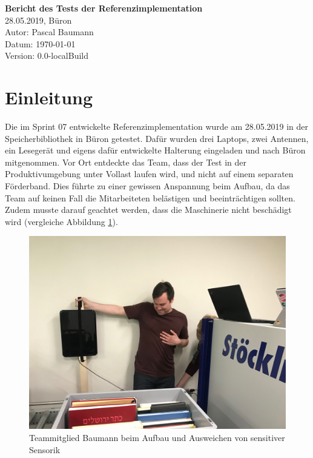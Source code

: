 \documentclass[parskip=full, a4paper]{scrartcl}
\providecommand{\docversion}{0.0-localBuild}
\begin{document}
\begin{titlepage}
\vspace*{2.5cm}
\noindent
\Huge{\textbf{Bericht des Tests der Referenzimplementation}} \\
\noindent
\Large{28.05.2019, Büron}\\
\vfill
\noindent
\large{Autor: Pascal Baumann}\\
\noindent
\large{Datum: \today}\\
\noindent
\large{Version: \docversion}\\
\end{titlepage}

\tableofcontents
\clearpage

\section{Einleitung}
Die im Sprint 07 entwickelte Referenzimplementation wurde am 28.05.2019 in der Speicherbibliothek in Büron getestet. Dafür wurden drei Laptops, zwei Antennen, ein Lesegerät und eigens dafür entwickelte Halterung eingeladen und nach Büron mitgenommen. Vor Ort entdeckte das Team, dass der Test in der Produktivumgebung unter Vollast laufen wird, und nicht auf einem separaten Förderband. Dies führte zu einer gewissen Anspannung beim Aufbau, da das Team auf keinen Fall die Mitarbeiteten belästigen und beeinträchtigen sollten. Zudem musste darauf geachtet werden, dass die Maschinerie nicht beschädigt wird (vergleiche Abbildung \ref{fig:AufbauSensorik}).

\begin{figure}[htb]
	\centering
	\includegraphics[keepaspectratio,width=\textwidth]{img/Testaufbau.jpg}
	\caption{Teammitglied Baumann beim Aufbau und Ausweichen von sensitiver Sensorik}
	\label{fig:AufbauSensorik}
\end{figure}
\end{document}
